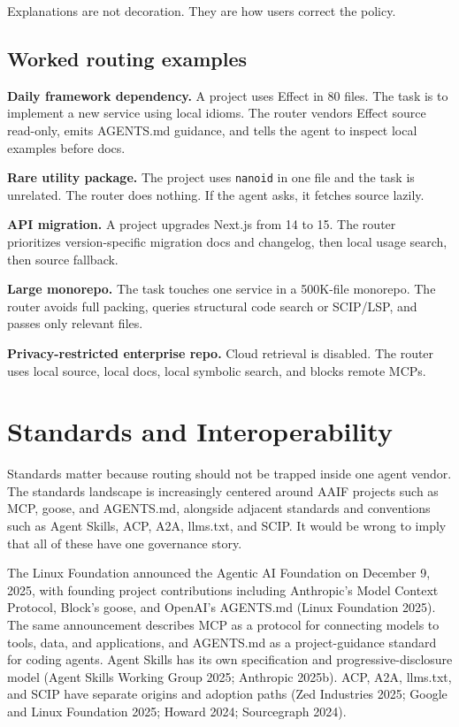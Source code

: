\documentclass[
  11pt,
  letterpaper,
  numbers=noendperiod,
  parskip=half]{scrartcl}
\begin{document}
Explanations are not decoration. They are how users correct the policy.

\subsection{Worked routing examples}\label{sec-examples}

\textbf{Daily framework dependency.} A project uses Effect in 80 files.
The task is to implement a new service using local idioms. The router
vendors Effect source read-only, emits AGENTS.md guidance, and tells the
agent to inspect local examples before docs.

\textbf{Rare utility package.} The project uses \texttt{nanoid} in one
file and the task is unrelated. The router does nothing. If the agent
asks, it fetches source lazily.

\textbf{API migration.} A project upgrades Next.js from 14 to 15. The
router prioritizes version-specific migration docs and changelog, then
local usage search, then source fallback.

\textbf{Large monorepo.} The task touches one service in a 500K-file
monorepo. The router avoids full packing, queries structural code search
or SCIP/LSP, and passes only relevant files.

\textbf{Privacy-restricted enterprise repo.} Cloud retrieval is
disabled. The router uses local source, local docs, local symbolic
search, and blocks remote MCPs.

\section{Standards and Interoperability}\label{sec-standards}

Standards matter because routing should not be trapped inside one agent
vendor. The standards landscape is increasingly centered around AAIF
projects such as MCP, goose, and AGENTS.md, alongside adjacent standards
and conventions such as Agent Skills, ACP, A2A, llms.txt, and SCIP. It
would be wrong to imply that all of these have one governance story.

The Linux Foundation announced the Agentic AI Foundation on December 9,
2025, with founding project contributions including Anthropic's Model
Context Protocol, Block's goose, and OpenAI's AGENTS.md (Linux
Foundation 2025). The same announcement describes MCP as a protocol for
connecting models to tools, data, and applications, and AGENTS.md as a
project-guidance standard for coding agents. Agent Skills has its own
specification and progressive-disclosure model (Agent Skills Working
Group 2025; Anthropic 2025b). ACP, A2A, llms.txt, and SCIP have separate
origins and adoption paths (Zed Industries 2025; Google and Linux
Foundation 2025; Howard 2024; Sourcegraph 2024).
\end{document}
